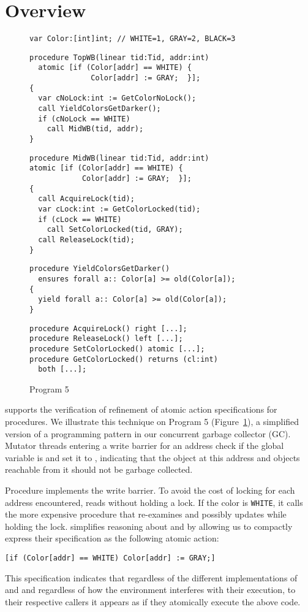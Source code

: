 \section{Overview}
\label{sec:overview}

\begin{figure}
\begin{verbatim}
var Color:[int]int; // WHITE=1, GRAY=2, BLACK=3
\end{verbatim}
\begin{verbatim}
procedure TopWB(linear tid:Tid, addr:int)
  atomic [if (Color[addr] == WHITE) { 
              Color[addr] := GRAY;  }];
{
  var cNoLock:int := GetColorNoLock();
  call YieldColorsGetDarker(); 
  if (cNoLock == WHITE) 
    call MidWB(tid, addr);
}
\end{verbatim}
\begin{verbatim}
procedure MidWB(linear tid:Tid, addr:int)
atomic [if (Color[addr] == WHITE) {
            Color[addr] := GRAY;  }];
{
  call AcquireLock(tid);
  var cLock:int := GetColorLocked(tid);
  if (cLock == WHITE) 
    call SetColorLocked(tid, GRAY);
  call ReleaseLock(tid);
}
\end{verbatim}
\begin{verbatim}
procedure YieldColorsGetDarker()
  ensures forall a:: Color[a] >= old(Color[a]);
{
  yield forall a:: Color[a] >= old(Color[a]);
}
\end{verbatim}
\begin{verbatim}
procedure AcquireLock() right [...];
procedure ReleaseLock() left [...];
procedure SetColorLocked() atomic [...];
procedure GetColorLocked() returns (cl:int)
  both [...];
\end{verbatim}
\caption{Program 5}
\label{fig:reft}
\end{figure}

\civl supports the verification of refinement of atomic action specifications for procedures. 
We illustrate this technique on Program 5 (Figure~\ref{fig:reft}),
a simplified version of a programming pattern in our concurrent garbage collector (GC).
Mutator threads entering a write barrier for an address  check
if the global variable  is 
and set it to , indicating that the object at this address
and objects reachable from it should not be garbage collected. 

Procedure  implements the write barrier.
To avoid the cost of locking for each address encountered,  reads  without holding a lock.
If the color is {\tt WHITE}, it calls the more expensive procedure  
that re-examines and possibly updates  while holding the lock.
\civl simplifies reasoning about  and  by allowing us to 
compactly express their specification as the following atomic action:
\begin{verbatim}
[if (Color[addr] == WHITE) Color[addr] := GRAY;]
\end{verbatim}
This specification indicates that regardless of the different implementations of 
 and  and regardless of how the environment interferes
with their execution, to their respective callers it appears as if they atomically execute the above code.

